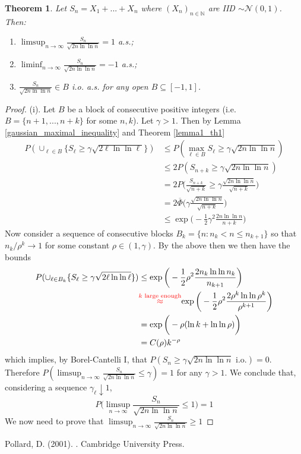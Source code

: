 \documentclass[]{interact}
\theoremstyle{plain}%
\newtheorem{theorem}{Theorem}[section]
\theoremstyle{definition}
\theoremstyle{remark}
\begin{document}
\begin{theorem}
	\label{lil_gauss}
	Let $S_n=X_1+...+X_n$ where $(X_n)_{n \in \mathbb{N}}$ are IID $\sim \mathcal{N}(0,1)$. Then:
	\begin{enumerate}
		\item $\limsup_{n\to \infty}\frac{S_n}{\sqrt{2n \ln \ln n}}=1$ a.s.;
		\item $\liminf_{n\to \infty}\frac{S_n}{\sqrt{2n \ln \ln n}}=-1$ a.s.;
		\item $\frac{S_n}{\sqrt{2n \ln \ln n}}\in B$ i.o. a.s. for any open $B\subseteq [-1,1]$.
	\end{enumerate}	
\end{theorem}
\begin{proof} (i). Let $B$ be a block of consecutive positive integers (i.e. $B=\{n+1,...,n+k\}$ for some $n,k$). Let $\gamma >1$. Then by Lemma \ref{gaussian_maximal_inequality} and Theorem \ref{lemma1_th1}
$$\begin{aligned}
P(\cup_{\ell \in B}\{S_\ell\geq \gamma \sqrt{2\ell \ln \ln \ell}\})&\leq P(\max_{\ell \in B}S_\ell\geq \gamma \sqrt{2n \ln \ln n})\\
&\leq 2P(S_{n+k}\geq \gamma \sqrt{2n \ln \ln n})\\
&=2P\bigg(\frac{S_{n+k}}{\sqrt{n+k}}\geq \gamma\frac{\sqrt{2n \ln \ln n}}{\sqrt{n+k}}\bigg)\\
&=2\overline{\Phi}\bigg(\gamma\frac{\sqrt{2n \ln \ln n}}{\sqrt{n+k}}\bigg)\\
&\leq \exp\bigg(-\frac{1}{2}\gamma^2\frac{{2n \ln \ln n}}{n+k}\bigg)
\end{aligned}$$
Now consider a sequence of consecutive blocks $B_k=\{n:n_k<n\leq n_{k+1}\}$ so that $n_k/\rho^k\to 1$ for some constant $\rho\in (1,\gamma)$. By the above then we then have the bounds
$$\begin{aligned}P(\cup_{\ell \in B_k}\{S_\ell\geq \gamma \sqrt{2\ell \ln \ln \ell}\})&\leq \exp\bigg(-\frac{1}{2}\rho^2\frac{{2n_k \ln \ln n_k}}{n_{k+1}}\bigg)\\
&\color{red}{\stackrel{k\textrm{ large enough}}{\approx}}\color{black}{
\exp\bigg(-\frac{1}{2}\rho^2\frac{{2\rho^k \ln \ln \rho^k}}{\rho^{k+1}}\bigg)}\\
&=\exp\bigg(-\rho (\ln k + \ln \ln \rho)\bigg)\\
&=C(\rho)k^{-\rho}
\end{aligned}$$
which implies, by Borel-Cantelli I, that $P(S_n\geq \gamma \sqrt{2n \ln \ln n} \textrm{ i.o.})=0$. Therefore $P(\limsup_{n \to \infty}\frac{S_n}{\sqrt{2n \ln \ln n}}\leq \gamma )=1$ for any $\gamma>1$. We conclude that, considering a sequence $\gamma_\ell\downarrow 1$,
$$P\bigg(\limsup_{n \to \infty}\frac{S_n}{\sqrt{2n \ln \ln n}}\leq 1 \bigg)=1$$
We now need to prove that $\limsup_{n \to \infty}\frac{S_n}{\sqrt{2n \ln \ln n}}\geq 1$
	
\end{proof}

\newpage 

\begin{thebibliography}{99}
	
    Pollard, D. (2001).
	.
	\newblock Cambridge University Press.
	
\end{thebibliography}
\end{document}

